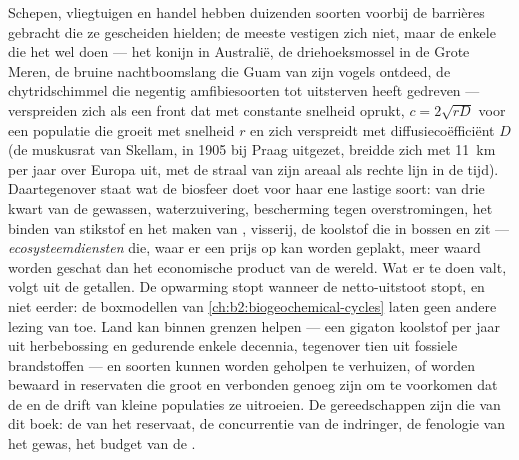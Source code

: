 \begin{proposition}\label{prop:b2:global-change:invasion}
Schepen, vliegtuigen en handel hebben duizenden soorten voorbij de barrières
gebracht die ze gescheiden hielden; de meeste vestigen zich niet, maar de
enkele die het wel doen --- het konijn in Australië, de driehoeksmossel in de
Grote Meren, de bruine nachtboomslang die Guam van zijn vogels ontdeed,
de chytridschimmel die negentig amfibiesoorten tot
uitsterven heeft gedreven --- verspreiden zich als een front dat met constante
snelheid oprukt, $c =
2\sqrt{rD}$ voor een populatie die groeit met snelheid $r$ en zich verspreidt
met diffusiecoëfficiënt $D$ (de muskusrat van Skellam, in 1905 bij
Praag uitgezet, breidde zich met \qty{11}{km} per jaar over Europa uit,
met de straal van zijn areaal als rechte lijn in de tijd). Daartegenover staat
wat de biosfeer doet voor haar ene lastige soort:
 van drie kwart van de gewassen, waterzuivering, bescherming tegen
overstromingen, het binden van stikstof en het maken van , visserij,
de koolstof die in bossen en  zit --- \emph{ecosysteemdiensten}
die, waar er een prijs op kan worden geplakt, meer waard worden geschat dan het
economische product van de wereld. Wat er te doen valt, volgt uit de getallen.
De opwarming stopt wanneer de netto-uitstoot stopt, en niet eerder: de
boxmodellen van \cref{ch:b2:biogeochemical-cycles} laten geen andere
lezing van \emph{} toe. Land kan binnen grenzen helpen --- een
gigaton koolstof per jaar uit herbebossing en  gedurende enkele
decennia, tegenover tien uit fossiele brandstoffen --- en soorten kunnen worden
geholpen te verhuizen, of worden bewaard in reservaten die groot en verbonden
genoeg zijn om te voorkomen dat de  en de drift van
kleine populaties ze uitroeien. De gereedschappen zijn die van dit boek: de
 van het reservaat, de concurrentie van de
indringer, de fenologie van het gewas, het budget van de .
\end{proposition}

